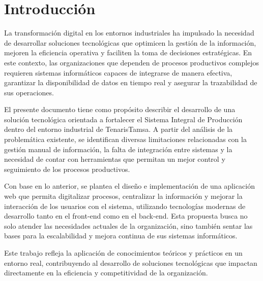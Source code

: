 \chapter*{Introducción}

La transformación digital en los entornos industriales ha impulsado la necesidad de desarrollar soluciones tecnológicas que optimicen la gestión de la información, mejoren la eficiencia operativa y faciliten la toma de decisiones estratégicas. En este contexto, las organizaciones que dependen de procesos productivos complejos requieren sistemas informáticos capaces de integrarse de manera efectiva, garantizar la disponibilidad de datos en tiempo real y asegurar la trazabilidad de sus operaciones.

El presente documento tiene como propósito describir el desarrollo de una solución tecnológica orientada a fortalecer el Sistema Integral de Producción dentro del entorno industrial de TenarisTamsa. A partir del análisis de la problemática existente, se identifican diversas limitaciones relacionadas con la gestión manual de información, la falta de integración entre sistemas y la necesidad de contar con herramientas que permitan un mejor control y seguimiento de los procesos productivos.

Con base en lo anterior, se plantea el diseño e implementación de una aplicación web que permita digitalizar procesos, centralizar la información y mejorar la interacción de los usuarios con el sistema, utilizando tecnologías modernas de desarrollo tanto en el front-end como en el back-end. Esta propuesta busca no solo atender las necesidades actuales de la organización, sino también sentar las bases para la escalabilidad y mejora continua de sus sistemas informáticos.

Este trabajo refleja la aplicación de conocimientos teóricos y prácticos en un entorno real, contribuyendo al desarrollo de soluciones tecnológicas que impactan directamente en la eficiencia y competitividad de la organización.